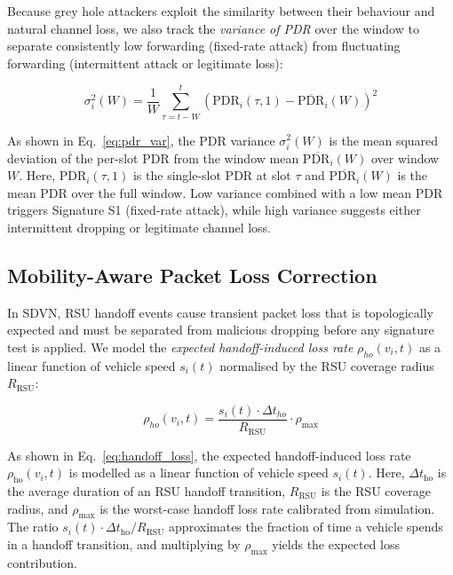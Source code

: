 \documentclass[12pt, a4paper]{report}
\begin{document}
Because grey hole attackers exploit the similarity between their behaviour and
natural channel loss, we also track the \emph{variance of PDR} over the window
to separate consistently low forwarding (fixed-rate attack) from fluctuating
forwarding (intermittent attack or legitimate loss):

\begin{equation}
\label{eq:pdr_var}
\sigma^2_i(W) = \frac{1}{W} \sum_{\tau=t-W}^{t}
\!\left(\text{PDR}_i(\tau,1) - \overline{\text{PDR}}_i(W)\right)^2
\end{equation}

As shown in Eq.~\eqref{eq:pdr_var}, the PDR variance $\sigma_i^2(W)$ is the mean squared deviation of the per-slot PDR from the window mean $\overline{\text{PDR}_i}(W)$ over window $W$. Here, $\text{PDR}_i(\tau, 1)$ is the single-slot PDR at slot $\tau$ and $\overline{\text{PDR}_i}(W)$ is the mean PDR over the full window. Low variance combined with a low mean PDR triggers Signature S1 (fixed-rate attack), while high variance suggests either intermittent dropping or legitimate channel loss.


\subsection{Mobility-Aware Packet Loss Correction}

In SDVN, RSU handoff events cause transient packet loss that is topologically
expected and must be separated from malicious dropping before any signature
test is applied. We model the \emph{expected handoff-induced loss rate}
$\rho_{ho}(v_i, t)$ as a linear function of vehicle speed $s_i(t)$ normalised
by the RSU coverage radius $R_{\text{RSU}}$:

\begin{equation}
\label{eq:handoff_loss}
\rho_{ho}(v_i, t) = \frac{s_i(t) \cdot \Delta t_{ho}}{R_{\text{RSU}}}
\cdot \rho_{\max}
\end{equation}

As shown in Eq.~\eqref{eq:handoff_loss}, the expected handoff-induced loss rate $\rho_{\text{ho}}(v_i, t)$ is modelled as a linear function of vehicle speed $s_i(t)$. Here, $\Delta t_{\text{ho}}$ is the average duration of an RSU handoff transition, $R_{\text{RSU}}$ is the RSU coverage radius, and $\rho_{\text{max}}$ is the worst-case handoff loss rate calibrated from simulation. The ratio $s_i(t) \cdot \Delta t_{\text{ho}} / R_{\text{RSU}}$ approximates the fraction of time a vehicle spends in a handoff transition, and multiplying by $\rho_{\text{max}}$ yields the expected loss contribution.
\end{document}
